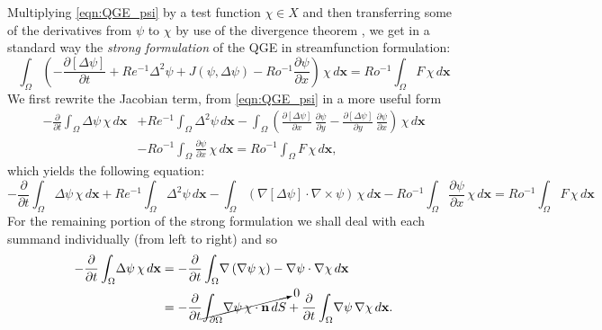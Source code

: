 Multiplying \eqref{eqn:QGE_psi} by a test function $\chi \in X$ and then
transferring some of the derivatives from $\psi$ to $\chi$ by use of the
divergence theorem , we get in a standard way the \emph{strong formulation} of
the QGE in streamfunction formulation:
\begin{equation*}
  \int_{\Omega}\! \left(-\frac{\partial \left[ \Delta \psi \right]}{\partial t} + Re^{-1}
    \Delta^2 \psi +  J(\psi,\Delta \psi) - Ro^{-1}\frac{\partial \psi}{\partial
    x}\right)\, \chi \, d\mathbf{x} = Ro^{-1} \int_{\Omega}\! F\, \chi \, d\mathbf{x}
\end{equation*}
We first rewrite the Jacobian term, from \eqref{eqn:QGE_psi} in a more useful
form
\begin{align*}
  -\frac{\partial}{\partial t} \int_{\Omega}\! \Delta \psi \, \chi \, d\mathbf{x}
    &+ Re^{-1} \int_{\Omega}\! \Delta^2 \psi \, d\mathbf{x}
    - \int_{\Omega}\! \left(\frac{\partial\left[\Delta\psi \right]}{\partial x}\, \frac{\partial
      \psi}{\partial y} -
    \frac{\partial\left[ \Delta\psi \right]}{\partial y}\,
    \frac{\partial \psi}{\partial x}\right)\, \chi\, d\mathbf{x} \\
    &- Ro^{-1} \int_{\Omega}\! \frac{\partial \psi}{\partial x}\, \chi \, d\mathbf{x}
    = Ro^{-1} \int_{\Omega}\! F\, \chi \, d\mathbf{x},
\end{align*}
which yields the following equation:
\begin{equation*}
  -\frac{\partial}{\partial t} \int_{\Omega}\! \Delta \psi \, \chi \, d\mathbf{x}
    + Re^{-1} \int_{\Omega}\! \Delta^2 \psi \, d\mathbf{x}
    - \int_{\Omega}\! \left(\nabla \left[\Delta\psi\right]\cdot \nabla \times
    \psi \right)\, \chi\,
    d\mathbf{x} -Ro^{-1} \int_{\Omega}\! \frac{\partial \psi}{\partial x}\,
    \chi \, d\mathbf{x} = Ro^{-1} \int_{\Omega}\! F\, \chi \, d\mathbf{x}
\end{equation*}
For the remaining portion of the strong formulation we shall deal with each
summand individually (from left to right) and so
\begin{align*}
  -\frac{\partial}{\partial t} \int_{\Omega}\! \Delta \psi\, \chi \, d\mathbf{x} &=
    -\frac{\partial}{\partial t} \int_{\Omega}\! \nabla \left( \nabla \psi \, \chi \right) -
    \nabla \psi \cdot \nabla \chi \, d\mathbf{x} \\
  &= -\frac{\partial}{\partial t} \cancelto{0}{\int_{\partial \Omega}\! \nabla \psi \, \chi
    \cdot \mathbf{n} \, dS} + \frac{\partial}{\partial t} \int_{\Omega}\! \nabla
    \psi\, \nabla \chi \, d\mathbf{x}.
\end{align*}
